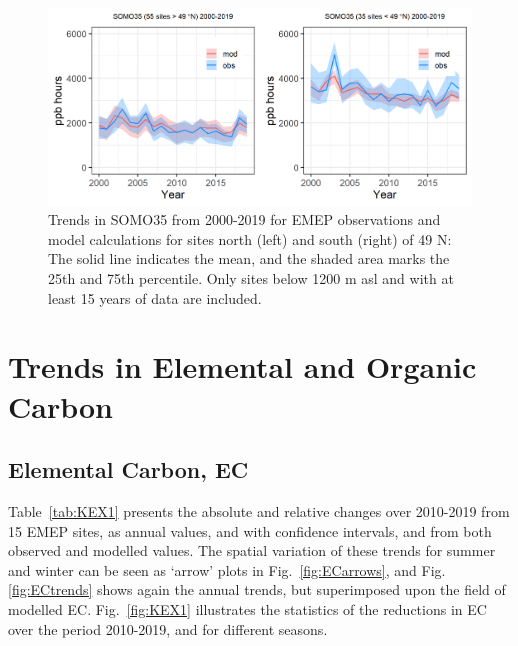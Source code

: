 \begin{figure}[h]
	\centering
	\includegraphics[width=0.74\paperwidth]{FIGS_TRENDS/SOMO35_2000_2019_1200m.png}
	\caption{\label{fig:O3_somo35trends}Trends in SOMO35 from 2000-2019 for EMEP observations and model calculations for sites north (left) and south (right) of 49 \degrees N: The solid line indicates the mean, and the shaded area marks the 25th and 75th percentile. Only sites below 1200 m asl and with at least 15 years of data are included.}
\end{figure}



\clearpage
\section{Trends in Elemental and Organic Carbon}
\label{sec:trendsECOC}
\subsection{Elemental Carbon, EC}
\label{ss:trendsEC}

Table~\ref{tab:KEX1} presents the absolute and relative changes over 2010-2019 from 15 EMEP sites, as annual values, and with confidence intervals, and from both observed and modelled values. The spatial variation of these trends for summer and winter can be seen as `arrow' plots in Fig.~\ref{fig:ECarrows}, and Fig.\ref{fig:ECtrends} shows again the annual trends, but superimposed upon the field of modelled EC.
Fig.~\ref{fig:KEX1} illustrates the statistics of the reductions in EC over the period 2010-2019, and for different seasons. 

